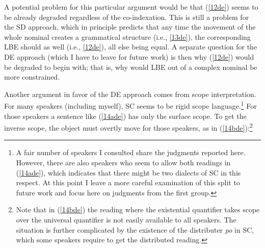 \documentclass[output=paper]{langscibook}
\begin{document}
\begin{exe}


\end{exe}

A potential problem for this particular argument would be that (\ref{12de}) seems to be already degraded regardless of the co-indexation. This is still a problem for the SD approach, which in principle predicts that any time the movement of the whole nominal creates a grammatical structure (i.e., \ref{13de}), the corresponding LBE should as well (i.e., \ref{12de}), all else being equal. A separate question for the DE approach (which I have to leave for future work) is then why (\ref{12de}) would be degraded to begin with; that is, why would LBE out of a complex nominal be more constrained.\largerpage

Another argument in favor of the DE approach comes from scope interpretation. For many speakers (including myself), SC seems to be rigid scope language.\footnote{A fair number of speakers I consulted share the judgments reported here. However, there are also speakers who seem to allow both readings in (\ref{14ade}), which indicates that there might be two dialects of SC in this respect. At this point I leave a more careful examination of this split to future work and focus here on judgments from the first group.} For those speakers a sentence like (\ref{14ade}) has only the surface scope. To get the inverse scope, the object must overtly move for those speakers, as in (\ref{14bde}):\footnote{Note that in (\ref{14bde}) the reading where the existential quantifier takes scope over the universal quantifier is not easily available to all speakers. The situation is further complicated by the existence of the distributer \textit{po} in SC, which some speakers require to get the distributed reading.} 
\end{document}
